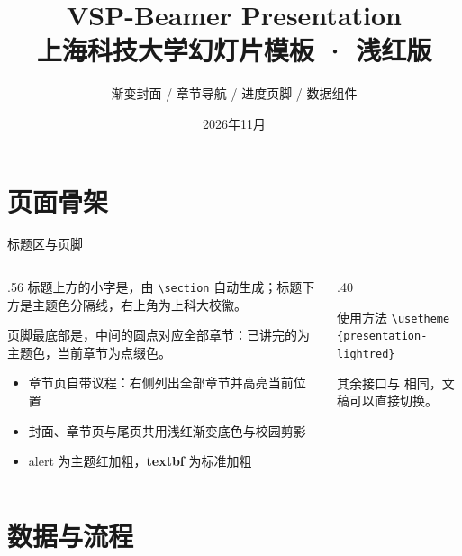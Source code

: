 \documentclass[aspectratio=169,10pt]{beamer}
\title[VSP-Beamer Presentation]{VSP-Beamer Presentation\\上海科技大学幻灯片模板 · 浅红版}
\subtitle{渐变封面 / 章节导航 / 进度页脚 / 数据组件}
\date{2026年11月}
\begin{document}
\VSPtitleframe

\section{页面骨架}

\begin{frame}[t]{标题区与页脚}
\begin{columns}[T,onlytextwidth]
  \begin{column}{.56\textwidth}
    标题上方的小字是，由 \texttt{\textbackslash section} 自动生成；标题下方是主题色分隔线，右上角为上科大校徽。

    页脚最底部是，中间的圆点对应全部章节：已讲完的为主题色，当前章节为点缀色。

    \begin{itemize}
      \item 章节页自带议程：右侧列出全部章节并高亮当前位置
      \item 封面、章节页与尾页共用浅红渐变底色与校园剪影
      \item \alert{alert} 为主题红加粗，\textbf{textbf} 为标准加粗
    \end{itemize}
  \end{column}
  \begin{column}{.40\textwidth}
    \begin{vspquote}{使用方法}
      \texttt{\textbackslash usetheme}\\\texttt{\{presentation-lightred\}}

      其余接口与  相同，文稿可以直接切换。
    \end{vspquote}
      
  \end{column}
\end{columns}
\end{frame}

\section{数据与流程}
\end{document}
